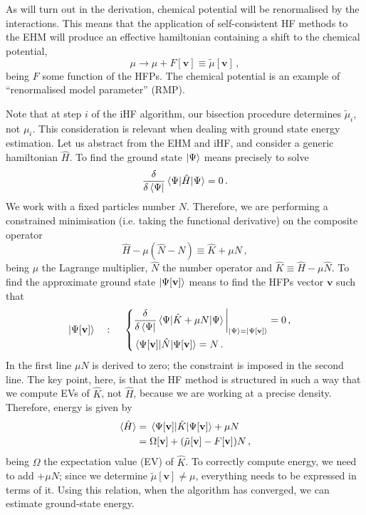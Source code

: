 As will turn out in the derivation, chemical potential will be renormalised by the interactions. This means that the application of self-consistent HF methods to the EHM will produce an effective hamiltonian containing a shift to the chemical potential,
\[
	\mu \to \mu + F[\mathbf{v}] \equiv \tilde{\mu} [\mathbf{v}] \, ,
\]
being $F$ some function of the HFPs. The chemical potential is an example of ``renormalised model parameter'' (RMP).

Note that at step $i$ of the iHF algorithm, our bisection procedure determines $\tilde{\mu}_i$, not $\mu_i$. This consideration is relevant when dealing with ground state energy estimation. Let us abstract from the EHM and iHF, and consider a generic hamiltonian $\hat H$. To find the ground state $\ket{\Psi}$ means precisely to solve
\[
	\fdv{}{\bra{\Psi}} \mel{\Psi}{\hat H}{\Psi} = 0 \, .
\]
We work with a fixed particles number $N$. Therefore, we are performing a constrained minimisation (i.e. taking the functional derivative) on the composite operator
\[
	\hat H - \mu (\hat N - N) \equiv \hat K + \mu N \, ,
\]
being $\mu$ the Lagrange multiplier, $\hat N$ the number operator and $\hat K \equiv \hat H - \mu \hat N$. To find the approximate ground state $\ket{\Psi[\mathbf{v}]}$ means to find the HFPs vector $\mathbf{v}$ such that
\[
	\ket{\Psi [\mathbf{v}]}
	\quad\colon\quad
	\begin{cases}
		\displaystyle
		\fdv{}{\bra{\Psi}} \mel{\Psi}{\hat K + \mu N}{\Psi} \bigg|_{\ket{\Psi}=\ket{\Psi [\mathbf{v}]}} = 0 \, , \\[1em]
		\mel{\Psi [\mathbf{v}]}{\hat N}{\Psi [\mathbf{v}]} = N \, .
	\end{cases}
\]
In the first line $\mu N$ is derived to zero; the constraint is imposed in the second line. The key point, here, is that the HF method is structured in such a way that we compute EVs of $\hat K$, not $\hat H$, because we are working at a precise density. Therefore, energy is given by
\[
\begin{aligned}
	\langle \hat H \rangle &= \mel{\Psi[\mathbf{v}]}{\hat K}{\Psi[\mathbf{v}]} + \mu N \\
	&= \Omega[\mathbf{v}] + (\tilde{\mu}[\mathbf{v}]-F[\mathbf{v}]) N \, ,
\end{aligned}
\]
being $\Omega$ the expectation value (EV) of $\hat K$. To correctly compute energy, we need to add $+\mu N$; since we determine $\tilde{\mu}[\mathbf{v}] \neq \mu$, everything needs to be expressed in terms of it. Using this relation, when the algorithm has converged, we can estimate ground-state energy.

